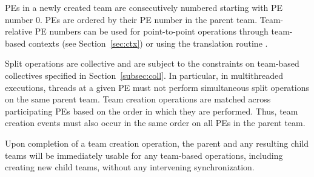 \acp{PE} in a newly created team are consecutively numbered starting with
\ac{PE} number 0. \acp{PE} are ordered by their \ac{PE} number in
the parent team. Team-relative \ac{PE}
numbers can be used for point-to-point operations through team-based
contexts (see Section~\ref{sec:ctx}) or using the translation routine
.

Split operations are collective and are subject to the constraints on
team-based collectives specified in Section~\ref{subsec:coll}. In particular,
in multithreaded executions, threads at a given \ac{PE} must not perform
simultaneous split operations on the same parent team.
Team creation operations are matched across participating PEs based
on the order in which they are performed. Thus, team creation events must also
occur in the same order on all \acp{PE} in the parent team.

Upon completion of a team creation operation, the parent and any resulting child teams
will be immediately usable for any team-based operations, including creating new child
teams, without any intervening synchronization.
